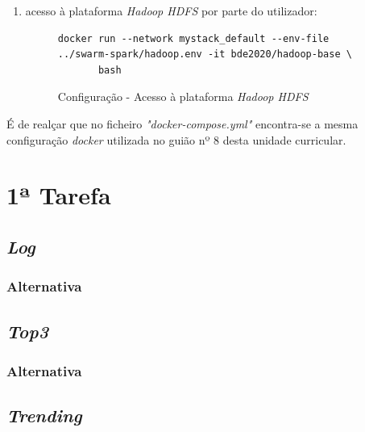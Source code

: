\documentclass[a4paper]{report}
\begin{document}
{\begin{enumerate}[label=\textbf{\arabic*.}]
            \item acesso à plataforma \textit{Hadoop HDFS} por parte do utilizador:
            \begin{figure}[H]
                \centering
                \begin{verbatim}
docker run --network mystack_default --env-file ../swarm-spark/hadoop.env -it bde2020/hadoop-base \
       bash
                \end{verbatim}
                \caption{Configuração - Acesso à plataforma \textit{Hadoop HDFS}}
                \label{fig:10}
            \end{figure}
        \end{enumerate}}

        É de realçar que no ficheiro \textit{"docker-compose.yml"} encontra-se a mesma configuração \textit{docker} utilizada no guião nº 8 desta unidade curricular.

    \section{1ª Tarefa} \label{sec:Task1}


        \subsection{\textit{Log}} \label{subsec:Task1-Log}
            \subsubsection{Alternativa} \label{sssec:Task1-Log-Alternativa}

        \subsection{\textit{Top3}} \label{subsec:Task1-Top3}
            \subsubsection{Alternativa} \label{sssec:Task1-Top3-Alternativa} 

        \subsection{\textit{Trending}} \label{subsec:Task1-Trending}
\end{document}
